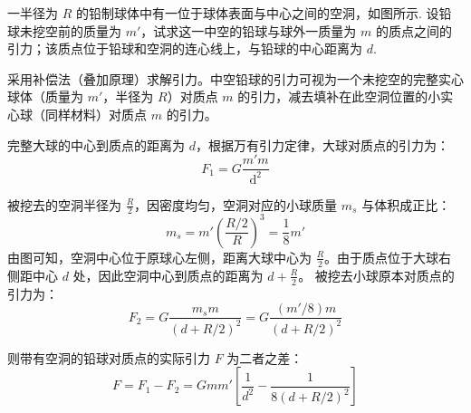 \begin{exercise}\label{ex:4.4}
一半径为 $R$ 的铅制球体中有一位于球体表面与中心之间的空洞，如图所示. 设铅球未挖空前的质量为 $m'$，试求这一中空的铅球与球外一质量为 $m$ 的质点之间的引力；该质点位于铅球和空洞的连心线上，与铅球的中心距离为 $d$.
\begin{center}
\end{center}
\end{exercise}
\begin{solution}
采用补偿法（叠加原理）求解引力。中空铅球的引力可视为一个未挖空的完整实心球体（质量为 $m'$，半径为 $R$）对质点 $m$ 的引力，减去填补在此空洞位置的小实心球（同样材料）对质点 $m$ 的引力。

完整大球的中心到质点的距离为 $d$，根据万有引力定律，大球对质点的引力为：
$$ F_1 = G\frac{m' m}{\mathrm{d}^2} $$

被挖去的空洞半径为 $\frac{R}{2}$，因密度均匀，空洞对应的小球质量 $m_s$ 与体积成正比：
$$ m_s = m' \left( \frac{R/2}{R} \right)^3 = \frac{1}{8} m' $$
由图可知，空洞中心位于原球心左侧，距离大球中心为 $\frac{R}{2}$。由于质点位于大球右侧距中心 $d$ 处，因此空洞中心到质点的距离为 $d + \frac{R}{2}$。
被挖去小球原本对质点的引力为：
$$ F_2 = G\frac{m_s m}{(d + R/2)^2} = G\frac{(m'/8) m}{(d + R/2)^2} $$

则带有空洞的铅球对质点的实际引力 $F$ 为二者之差：
$$ F = F_1 - F_2 = G m m' \left[ \frac{1}{d^2} - \frac{1}{8(d + R/2)^2} \right] $$
\end{solution}

